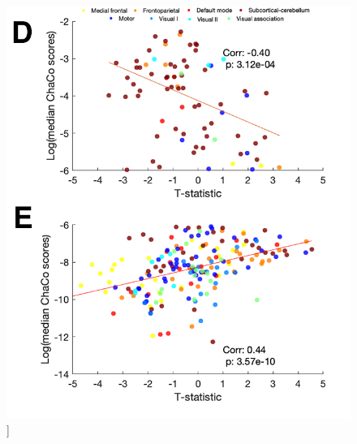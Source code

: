\documentclass[phd,tocprelim]{cornell}
\renewcommand{\caption}[1]{\singlespacing\hangcaption{#1}\normalspacing}
\begin{document}
\null
\vfill
\clearpage
\null
\vfill
\begin{figure}[h!]
		\ContinuedFloat
		\captionsetup{labelformat=adja-page}
    \centering
    \includegraphics[width=\textwidth]{chapter1/SupplementaryFigure10DE.png}
    \caption[]{}
\end{figure}
\null
\vfill
\clearpage
\null
\vfill
\end{document}
